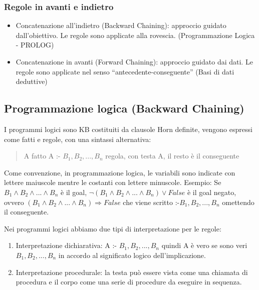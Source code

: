 \documentclass{article}
\begin{document}
\subsubsection{Regole in avanti e indietro}
\begin{itemize}
    \item Concatenazione all'indietro (Backward Chaining): approccio guidato dall'obiettivo. Le regole sono applicate alla rovescia. (Programmazione Logica - PROLOG)
    \item Concatenazione in avanti (Forward Chaining): approccio guidato dai dati. Le regole sono applicate nel senso “antecedente-conseguente” (Basi di dati deduttive)
\end{itemize}

\subsection{Programmazione logica (Backward Chaining)}
I programmi logici sono KB costituiti da clausole Horn definite, vengono espressi come fatti e regole, con una sintassi alternativa:
\begin{quote}
    A \quad fatto \newline
 	A :- $B_1, B_2, ... , B_n$ \quad regola, con testa A, il resto è il conseguente
\end{quote}
Come convenzione, in programmazione logica, le variabili sono indicate con lettere maiuscole mentre le costanti con lettere minuscole.
Esempio: \newline
Se $B_1 \land B_2 \land ... \land B_n$ \quad è il goal, \newline
$\neg (B_1 \land B_2 \land ... \land B_n) \lor False$ \quad è il goal negato, ovvero \newline
$(B_1 \land B_2 \land ... \land B_n) \Rightarrow False$ \quad che viene scritto \newline
:-$B_1, B_2, ..., B_n$ \quad omettendo il conseguente. \clearpage

Nei programmi logici abbiamo due tipi di interpretazione per le regole:
\begin{enumerate}
    \item Interpretazione dichiarativa:	A :- $B_1, B_2, ..., B_n$ quindi A è vero se sono veri $B_1, B_2, ..., B_n$ in accordo al significato logico dell'implicazione.
    \item Interpretazione procedurale: la testa può essere vista come una chiamata di procedura e il corpo come una serie di procedure da eseguire in sequenza.
\end{enumerate}
\end{document}
